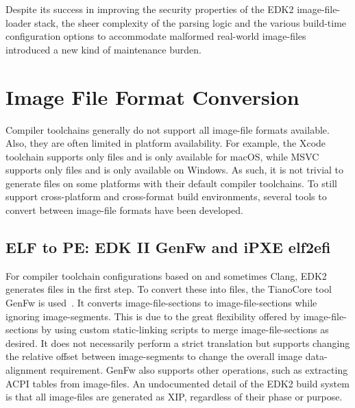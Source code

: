 Despite its success in improving the security properties of the \gls{EDK2} \gls{image-file-loader} stack, the sheer complexity of the parsing logic and the various build-time configuration options to accommodate malformed real-world \glspl{image-file} introduced a new kind of maintenance burden.

\section{Image File Format Conversion}
\label{sec:img_conv}

Compiler toolchains generally do not support all \gls{image-file} formats available. Also, they are often limited in platform availability. For example, the  Xcode toolchain supports only  files and is only available for  macOS, while \gls{MSVC} supports only  files and is only available on Windows. As such, it is not trivial to generate  files on some platforms with their default compiler toolchains. To still support cross-platform and cross-format build environments, several tools to convert between \gls{image-file} formats have been developed.

\subsection{ELF to PE: EDK II GenFw and iPXE elf2efi}
\label{sec:genfw}

For compiler toolchain configurations based on  and sometimes Clang, \gls{EDK2} generates  files in the first step. To convert these into  files, the TianoCore tool GenFw is used~\cite{edk2}. It converts  \glspl{image-file-section} to  \glspl{image-file-section} while ignoring  \glspl{image-segment}. This is due to the great flexibility offered by  \glspl{image-file-section} by using custom \gls{static-linking} scripts to merge  \glspl{image-file-section} as desired. It does not necessarily perform a strict translation but supports changing the relative offset between \glspl{image-segment} to change the overall \gls{image} \gls{data-alignment} requirement. GenFw also supports other operations, such as extracting \gls{ACPI} tables from \glspl{image-file}. An undocumented detail of the \gls{EDK2} build system is that all \glspl{image-file} are generated as \gls{XIP}, regardless of their phase or purpose.


